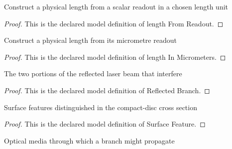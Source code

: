 \begin{definition}
  \label{def:physics:phyx-mini-0116:phyxminiproblems-problemphyxmini0116-lengthfromreadout}
  Construct a physical length from a scalar readout in a chosen length unit
\end{definition}
\begin{proof}
  This is the declared model definition of length From Readout.
\end{proof}
\begin{definition}
  \label{def:physics:phyx-mini-0116:phyxminiproblems-problemphyxmini0116-lengthinmicrometers}
  Construct a physical length from its micrometre readout
\end{definition}
\begin{proof}
  This is the declared model definition of length In Micrometers.
\end{proof}
\begin{definition}
  \label{def:physics:phyx-mini-0116:phyxminiproblems-problemphyxmini0116-reflectedbranch}
  The two portions of the reflected laser beam that interfere
\end{definition}
\begin{proof}
  This is the declared model definition of Reflected Branch.
\end{proof}
\begin{definition}
  \label{def:physics:phyx-mini-0116:phyxminiproblems-problemphyxmini0116-surfacefeature}
  Surface features distinguished in the compact-disc cross section
\end{definition}
\begin{proof}
  This is the declared model definition of Surface Feature.
\end{proof}
\begin{definition}
  \label{def:physics:phyx-mini-0116:phyxminiproblems-problemphyxmini0116-opticalmedium}
  Optical media through which a branch might propagate
\end{definition}
